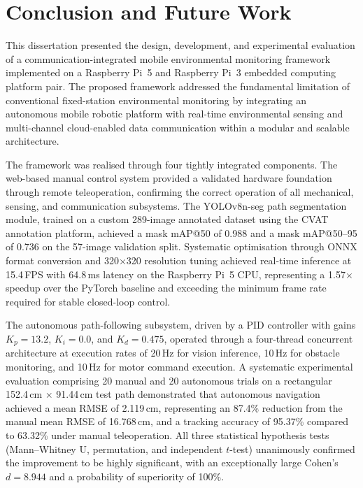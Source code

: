 
\chapter{Conclusion and Future Work}

This dissertation presented the design, development, and experimental
evaluation of a communication-integrated mobile environmental monitoring
framework implemented on a Raspberry Pi~5 and Raspberry Pi~3 embedded
computing platform pair. The proposed framework addressed the fundamental
limitation of conventional fixed-station environmental monitoring by
integrating an autonomous mobile robotic platform with real-time
environmental sensing and multi-channel cloud-enabled data communication
within a modular and scalable architecture.

The framework was realised through four tightly integrated components.
The web-based manual control system provided a validated hardware
foundation through remote teleoperation, confirming the correct
operation of all mechanical, sensing, and communication subsystems.
The YOLOv8n-seg path segmentation module, trained on a custom
289-image annotated dataset using the CVAT annotation platform,
achieved a mask mAP@50 of 0.988 and a mask mAP@50--95 of 0.736 on
the 57-image validation split. Systematic optimisation through ONNX
format conversion and 320$\times$320 resolution tuning achieved
real-time inference at 15.4\,FPS with 64.8\,ms latency on the
Raspberry Pi~5 CPU, representing a 1.57$\times$ speedup over the
PyTorch baseline and exceeding the minimum frame rate required for
stable closed-loop control.

The autonomous path-following subsystem, driven by a PID controller
with gains $K_p = 13.2$, $K_i = 0.0$, and $K_d = 0.475$, operated
through a four-thread concurrent architecture at execution rates of
20\,Hz for vision inference, 10\,Hz for obstacle monitoring, and
10\,Hz for motor command execution. A systematic experimental
evaluation comprising 20 manual and 20 autonomous trials on a
rectangular 152.4\,cm $\times$ 91.44\,cm test path demonstrated that
autonomous navigation achieved a mean RMSE of 2.119\,cm, representing
an 87.4\% reduction from the manual mean RMSE of 16.768\,cm, and a
tracking accuracy of 95.37\% compared to 63.32\% under manual
teleoperation. All three statistical hypothesis tests (Mann--Whitney U,
permutation, and independent $t$-test) unanimously confirmed the
improvement to be highly significant, with an exceptionally large
Cohen's $d = 8.944$ and a probability of superiority of 100\%.

